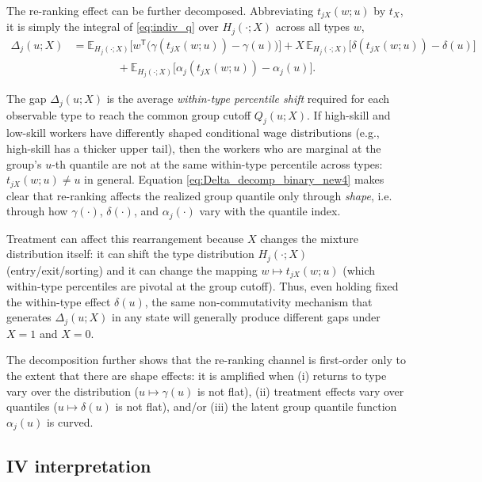\documentclass[12pt]{article}
\newcommand{\E}{\mathbb{E}}
\newcommand{\T}{\mathsf{T}} %
\begin{document}
The re-ranking effect can be further decomposed. Abbreviating $t_{jX}(w;u)$ by $t_X$, it is simply the integral of \eqref{eq:indiv_q} over $H_j(\cdot;X)$ across all types $w$,
\begin{equation}\label{eq:Delta_decomp_binary_new4}
\begin{aligned}
\Delta_j(u;X)
&=
\E_{H_j(\cdot;X)}\!\Big[
w^{\T}\big(\gamma(t_{jX}(w;u))-\gamma(u)\big)
\Big]
+
X\,\E_{H_j(\cdot;X)}\!\Big[
\delta(t_{jX}(w;u))-\delta(u)
\Big]
\\
&\qquad\qquad
+
\E_{H_j(\cdot;X)}\!\Big[
\alpha_j(t_{jX}(w;u))-\alpha_j(u)
\Big].
\end{aligned}
\end{equation}

The gap $\Delta_j(u;X)$ is the average \emph{within-type percentile shift} required for each observable type to reach the common group cutoff $Q_j(u;X)$.
If high-skill and low-skill workers have differently shaped conditional wage distributions (e.g., high-skill has a thicker upper tail), then the workers who are marginal at the group's $u$-th quantile are not at the same within-type percentile across types: $t_{jX}(w;u)\neq u$ in general.
Equation \eqref{eq:Delta_decomp_binary_new4} makes clear that re-ranking affects the realized group quantile only through \emph{shape}, i.e. through how $\gamma(\cdot)$, $\delta(\cdot)$, and $\alpha_j(\cdot)$ vary with the quantile index.

Treatment can affect this rearrangement because $X$ changes the mixture distribution itself: it can shift the type distribution $H_j(\cdot;X)$ (entry/exit/sorting) and it can change the mapping $w\mapsto t_{jX}(w;u)$ (which within-type percentiles are pivotal at the group cutoff).
Thus, even holding fixed the within-type effect $\delta(u)$, the same non-commutativity mechanism that generates $\Delta_j(u;X)$ in any state will generally produce different gaps under $X=1$ and $X=0$.

The decomposition further shows that the re-ranking channel is first-order only to the extent that there are shape effects: it is amplified when (i) returns to type vary over the distribution ($u\mapsto\gamma(u)$ is not flat), (ii) treatment effects vary over quantiles ($u\mapsto\delta(u)$ is not flat), and/or (iii) the latent group quantile function $\alpha_j(u)$ is curved.


\subsection{IV interpretation} \label{sec:iv_decomposition}
\end{document}
